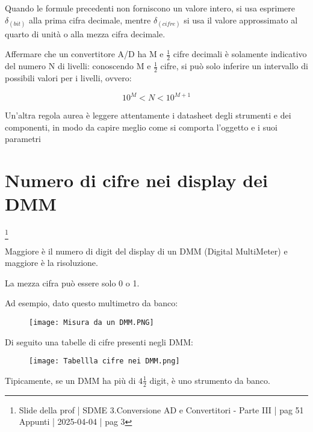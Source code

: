 Quando le formule precedenti non forniscono un valore intero, si usa esprimere $\delta_{(bit)}$ alla prima cifra decimale, 
mentre $\delta_{(cifre)}$ si usa il valore approssimato al quarto di unità o alla mezza cifra decimale. \newline 

Affermare che un convertitore A/D ha M e $\frac{1}{2}$ cifre decimali è solamente indicativo del numero N di livelli: 
conoscendo M e $\frac{1}{2}$ cifre, si può solo inferire un intervallo di possibili valori per i livelli, ovvero: 

{
    \Large 
    \begin{equation}
        10^{M} < N < 10^{M+1}
    \end{equation}
}

\begin{tcolorbox}
    Un'altra regola aurea è leggere attentamente i datasheet degli strumenti e dei componenti, in modo da capire meglio come si comporta l'oggetto e i suoi parametri
\end{tcolorbox}

\newpage 

\section{Numero di cifre nei display dei DMM}
\footnote{Slide della prof | SDME 3.Conversione AD e Convertitori - Parte III | pag 51 \\  
Appunti | 2025-04-04 | pag 3}

Maggiore è il numero di digit del display di un DMM (Digital MultiMeter) e maggiore è la risoluzione. \newline 

La mezza cifra può essere solo 0 o 1. \newline 

Ad esempio, dato questo multimetro da banco: 

\begin{figure}[h]
    \centering
    \texttt{[image: Misura da un DMM.PNG]}
\end{figure}

Di seguito una tabelle di cifre presenti negli DMM: 

\begin{figure}[h]
    \centering
    \texttt{[image: Tabellla cifre nei DMM.png]}
\end{figure}

Tipicamente, se un DMM ha più di $4 \frac{1}{2}$ digit, è uno strumento da banco. \newline 

